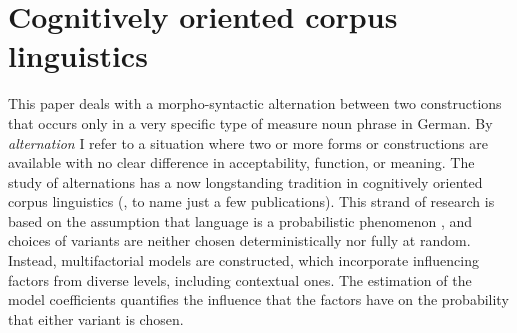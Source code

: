 \documentclass[USenglish]{article}
\begin{document}


\section{Cognitively oriented corpus linguistics}
\label{sec:cogocl}

This paper deals with a morpho-syntactic alternation between two constructions that occurs only in a very specific type of measure noun phrase in German.
By \textit{alternation} I refer to a situation where two or more forms or constructions are available with no clear difference in acceptability, function, or meaning.
The study of alternations has a now longstanding tradition in cognitively oriented corpus linguistics (\citealp{BresnanEa2007,BresnanHay2010,BresnanFord2010,DivjakArppe2013,Gries2015,NessetJanda2010}, to name just a few publications).
This strand of research is based on the assumption that language is a probabilistic phenomenon \citep{Bresnan2007}, and choices of variants are neither chosen deterministically nor fully at random.
Instead, multifactorial models are constructed, which incorporate influencing factors from diverse levels, including contextual ones.
The estimation of the model coefficients quantifies the influence that the factors have on the probability that either variant is chosen.
\end{document}
